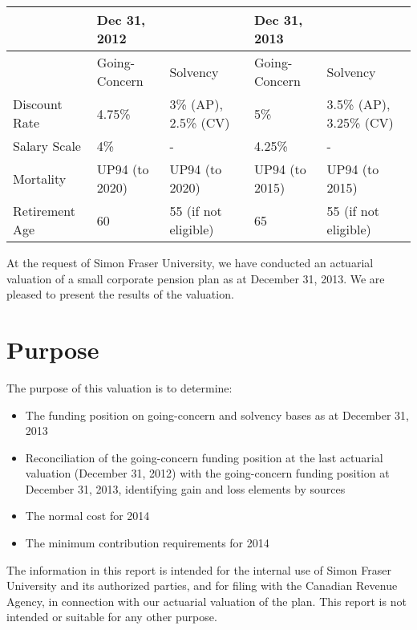 \documentclass{report}
\begin{document}
\begin{table}[ht]
\bgroup
\def\arraystretch{1.5}
\begin{tabular}{l  l  l  l  l}
\hline
& \textbf{Dec 31, 2012} &  & \textbf{Dec 31, 2013} & \\ \hline
& Going-Concern & Solvency & Going-Concern & Solvency \\ \hline
Discount Rate & 4.75\% & 3\% (AP), 2.5\% (CV)  & 5\% & 3.5\% (AP), 3.25\% (CV) \\ \hline
Salary Scale & 4\% & - & 4.25\% & - \\ \hline
Mortality & UP94 (to 2020) & UP94 (to 2020) & UP94 (to 2015) & UP94 (to 2015) \\ \hline
Retirement Age & 60 & 55 (if not eligible) & 65 & 55 (if not eligible) \\ \hline
\end{tabular}
\egroup
\end{table}


\color{black}
At the request of Simon Fraser University, we have conducted an actuarial valuation of a small corporate pension plan as at December 31, 2013. We are pleased to present the results of the valuation.

\section{Purpose} 

The purpose of this valuation is to determine:
\begin{itemize}
\item The funding position on going-concern and solvency bases as  at December 31, 2013 
\item Reconciliation of the going-concern funding position at the last actuarial valuation (December 31, 2012) with the going-concern funding position at December 31, 2013, identifying gain and loss elements by sources
\item The normal cost for 2014
\item The minimum contribution requirements for 2014
\end{itemize}

\vspace{3mm}
The information in this report is intended for the internal use of Simon Fraser University and its authorized parties, and for filing with the Canadian Revenue Agency, in connection with our actuarial valuation of the plan. This report is not intended or suitable for any other purpose.
\end{document}
